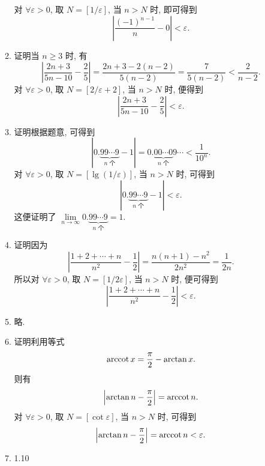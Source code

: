 \begin{enumerate}
\begin{enumerate}[(1)]
\[                \]
                对 $\forall\varepsilon > 0$, 取 $N = [1/\varepsilon]$, 当 $n > N$ 时, 即可得到
                \[
                    \left|\frac{(-1)^{n-1}}{n} - 0\right| < \varepsilon.   
                \]
            \item %
                {\heiti 证明}\quad 当 $n \geqslant 3$ 时, 有
                \[
                    \left|\frac{2n+3}{5n-10} - \frac25\right| = \frac{2n+3-2(n-2)}{5(n-2)} = \frac{7}{5(n-2)} < \frac{2}{n-2}.    
                \]
                对 $\forall\varepsilon > 0$, 取 $N = [2/\varepsilon + 2]$, 当 $n > N$ 时, 便得到
                \[
                    \left|\frac{2n+3}{5n-10} - \frac25\right| < \varepsilon.   
                \]
            \item %
                {\heiti 证明}\quad 根据题意, 可得到
                \[
                    |0.\underbrace{99\cdots9}_{\text{$n$ 个}} - 1| = 0.\underbrace{00\cdots0}_{\text{$n$ 个}}9\cdots < \frac{1}{10^n}.    
                \]
                对 $\forall\varepsilon > 0$, 取 $N = [\lg(1/\varepsilon)]$, 当 $n > N$ 时, 可得到
                \[
                    |0.\underbrace{99\cdots9}_{\text{$n$ 个}} - 1| < \varepsilon.   
                \]
                这便证明了 $\lim\limits_{n\to\infty}0.\underbrace{99\cdots9}_{\text{$n$ 个}} = 1$.
            \item %
                {\heiti 证明}\quad 因为
                \[
                    \left|\frac{1+2+\cdots+n}{n^2} - \frac12\right| = \frac{n(n+1)-n^2}{2n^2} = \frac{1}{2n}.    
                \]
                所以对 $\forall\varepsilon > 0$, 取 $N = [1/2\varepsilon]$, 当 $n > N$ 时, 便可得到
                \[
                    \left|\frac{1+2+\cdots+n}{n^2} - \frac12\right| < \varepsilon.   
                \]
            \item %
                略.
            \item %
                {\heiti 证明}\quad 利用等式
                \[
                    \mathrm{arccot}\, x = \frac{\pi}{2} - \arctan x.    
                \]
                则有
                \[
                    \left|\arctan n - \frac{\pi}{2}\right| = \mathrm{arccot}\, n.    
                \]
                对 $\forall\varepsilon > 0$, 取 $N = [\cot\varepsilon]$, 当 $n > N$ 时, 可得到
                \[
                    \left|\arctan n - \frac{\pi}{2}\right| = \mathrm{arccot}\, n < \varepsilon.   
                \]
            \item 1.10

\end{enumerate}
\end{enumerate}
